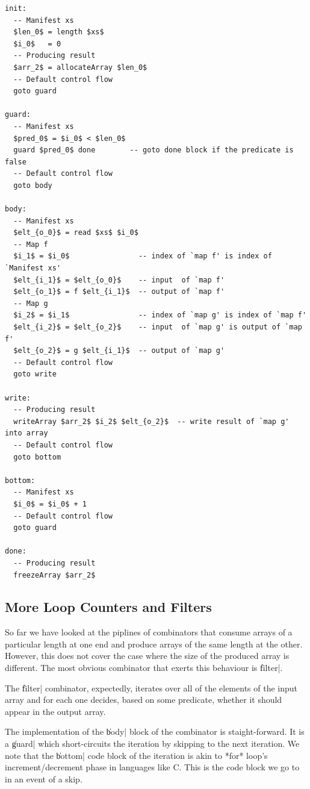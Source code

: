 \documentclass[preamble.tex]{subfiles}
\begin{document}
\begin{lstlisting}[mathescape]
init:
  -- Manifest xs
  $len_0$ = length $xs$
  $i_0$   = 0
  -- Producing result
  $arr_2$ = allocateArray $len_0$
  -- Default control flow
  goto guard

guard:
  -- Manifest xs
  $pred_0$ = $i_0$ < $len_0$
  guard $pred_0$ done        -- goto done block if the predicate is false
  -- Default control flow
  goto body

body:
  -- Manifest xs
  $elt_{o_0}$ = read $xs$ $i_0$
  -- Map f
  $i_1$ = $i_0$                -- index of `map f' is index of `Manifest xs'
  $elt_{i_1}$ = $elt_{o_0}$    -- input  of `map f'
  $elt_{o_1}$ = f $elt_{i_1}$  -- output of `map f'
  -- Map g
  $i_2$ = $i_1$                -- index of `map g' is index of `map f'
  $elt_{i_2}$ = $elt_{o_2}$    -- input  of `map g' is output of `map f'
  $elt_{o_2}$ = g $elt_{i_1}$  -- output of `map g'
  -- Default control flow
  goto write

write:
  -- Producing result
  writeArray $arr_2$ $i_2$ $elt_{o_2}$  -- write result of `map g' into array
  -- Default control flow
  goto bottom

bottom:
  -- Manifest xs
  $i_0$ = $i_0$ + 1
  -- Default control flow
  goto guard

done:
  -- Producing result
  freezeArray $arr_2$
\end{lstlisting}


\subsection{\label{sec:Loop:Filt}More Loop Counters and Filters}

So far we have looked at the piplines of combinators that consume arrays of a particular length at one end and produce arrays of the same length at the other. However, this does not cover the case where the size of the produced array is different. The most obvious combinator that exerts this behaviour is \|filter|.

The \|filter| combinator, expectedly, iterates over all of the elements of the input array and for each one decides, based on some predicate, whether it should appear in the output array.

The implementation of the \|body| block of the combinator is staight-forward. It is a \|guard| which short-circuits the iteration by skipping to the next iteration. We note that the \|bottom| code block of the iteration is akin to *for* loop's increment/decrement phase in languages like C. This is the code block we go to in an event of a skip.
\end{document}
